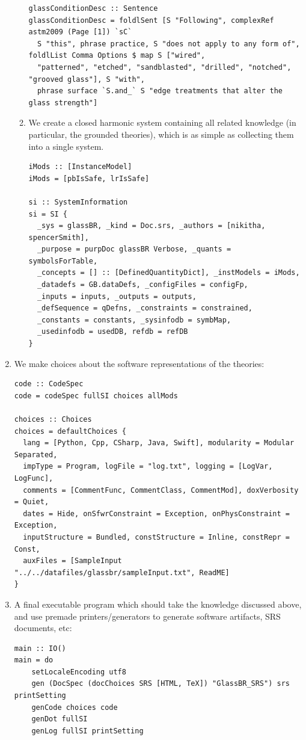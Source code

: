 \documentclass[sigconf,review]{acmart}
\begin{document}
\begin{enumerate}
\begin{enumerate}
\begin{verbatim}
glassConditionDesc :: Sentence
glassConditionDesc = foldlSent [S "Following", complexRef astm2009 (Page [1]) `sC` 
  S "this", phrase practice, S "does not apply to any form of", foldlList Comma Options $ map S ["wired",
  "patterned", "etched", "sandblasted", "drilled", "notched", "grooved glass"], S "with", 
  phrase surface `S.and_` S "edge treatments that alter the glass strength"]
      \end{verbatim}
    \item %
      We create a closed harmonic system containing all related knowledge (in particular, the grounded theories), which is as simple as collecting them into a single system.
      \begin{verbatim}
iMods :: [InstanceModel]
iMods = [pbIsSafe, lrIsSafe]

si :: SystemInformation
si = SI {
  _sys = glassBR, _kind = Doc.srs, _authors = [nikitha, spencerSmith],
  _purpose = purpDoc glassBR Verbose, _quants = symbolsForTable,
  _concepts = [] :: [DefinedQuantityDict], _instModels = iMods,
  _datadefs = GB.dataDefs, _configFiles = configFp,
  _inputs = inputs, _outputs = outputs,
  _defSequence = qDefns, _constraints = constrained,
  _constants = constants, _sysinfodb = symbMap,
  _usedinfodb = usedDB, refdb = refDB
}
      \end{verbatim}
    \end{enumerate}
  \item\label{it:ex:tocode} %
    We make choices about the software representations of the theories:
    \begin{verbatim}
code :: CodeSpec
code = codeSpec fullSI choices allMods

choices :: Choices
choices = defaultChoices {
  lang = [Python, Cpp, CSharp, Java, Swift], modularity = Modular Separated,
  impType = Program, logFile = "log.txt", logging = [LogVar, LogFunc],
  comments = [CommentFunc, CommentClass, CommentMod], doxVerbosity = Quiet,
  dates = Hide, onSfwrConstraint = Exception, onPhysConstraint = Exception,
  inputStructure = Bundled, constStructure = Inline, constRepr = Const,
  auxFiles = [SampleInput "../../datafiles/glassbr/sampleInput.txt", ReadME] 
}
    \end{verbatim}
  \item\label{it:ex:recipe} %
    A final executable program which should take the knowledge discussed above, and use premade printers/generators to generate software artifacts, SRS documents, etc:
    \begin{verbatim}
main :: IO()
main = do
    setLocaleEncoding utf8
    gen (DocSpec (docChoices SRS [HTML, TeX]) "GlassBR_SRS") srs printSetting
    genCode choices code
    genDot fullSI
    genLog fullSI printSetting
    \end{verbatim}
\end{enumerate}
\end{document}
